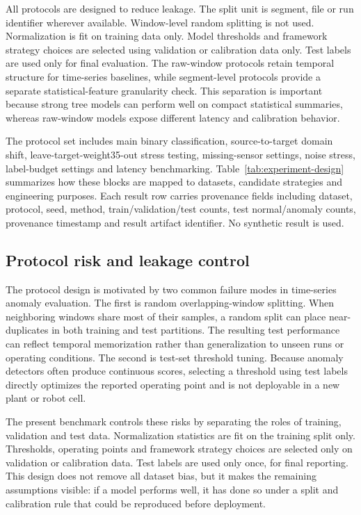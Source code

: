 



All protocols are designed to reduce leakage. The split unit is segment, file or run identifier wherever available. Window-level random splitting is not used. Normalization is fit on training data only. Model thresholds and framework strategy choices are selected using validation or calibration data only. Test labels are used only for final evaluation. The raw-window protocols retain temporal structure for time-series baselines, while segment-level protocols provide a separate statistical-feature granularity check. This separation is important because strong tree models can perform well on compact statistical summaries, whereas raw-window models expose different latency and calibration behavior.



The protocol set includes main binary classification, source-to-target domain shift, leave-target-weight35-out stress testing, missing-sensor settings, noise stress, label-budget settings and latency benchmarking. Table~\ref{tab:experiment-design} summarizes how these blocks are mapped to datasets, candidate strategies and engineering purposes. Each result row carries provenance fields including dataset, protocol, seed, method, train/validation/test counts, test normal/anomaly counts, provenance timestamp and result artifact identifier. No synthetic result is used.



\subsection{Protocol risk and leakage control}

The protocol design is motivated by two common failure modes in time-series anomaly evaluation. The first is random overlapping-window splitting. When neighboring windows share most of their samples, a random split can place near-duplicates in both training and test partitions. The resulting test performance can reflect temporal memorization rather than generalization to unseen runs or operating conditions. The second is test-set threshold tuning. Because anomaly detectors often produce continuous scores, selecting a threshold using test labels directly optimizes the reported operating point and is not deployable in a new plant or robot cell.

The present benchmark controls these risks by separating the roles of training, validation and test data. Normalization statistics are fit on the training split only. Thresholds, operating points and framework strategy choices are selected only on validation or calibration data. Test labels are used only once, for final reporting. This design does not remove all dataset bias, but it makes the remaining assumptions visible: if a model performs well, it has done so under a split and calibration rule that could be reproduced before deployment.




